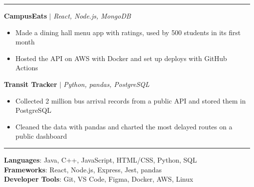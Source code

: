 \documentclass[letterpaper,11pt]{article}
\renewcommand{\section}[1]{\vspace{5pt}{\large\scshape #1}\par\vspace{-3pt}\rule{\textwidth}{0.4pt}\par\vspace{2pt}}
\newcommand{\resumeItem}[1]{\item\small{#1}}
\newcommand{\resumeSubHeadingListStart}{\begin{list}{}{\setlength{\leftmargin}{0.15in}\setlength{\itemsep}{1pt}\setlength{\topsep}{0pt}}}
\newcommand{\resumeSubHeadingListEnd}{\end{list}}
\newcommand{\resumeItemListStart}{\begin{itemize}\setlength{\itemsep}{-2pt}}
\newcommand{\resumeItemListEnd}{\end{itemize}}
\begin{document}
\section{Projects}
    \resumeSubHeadingListStart
      \item
          \textbf{CampusEats} $|$ \emph{React, Node.js, MongoDB}
          \resumeItemListStart
            \resumeItem{Made a dining hall menu app with ratings, used by 500 students in its first month}
            \resumeItem{Hosted the API on AWS with Docker and set up deploys with GitHub Actions}
          \resumeItemListEnd
      \item
          \textbf{Transit Tracker} $|$ \emph{Python, pandas, PostgreSQL}
          \resumeItemListStart
            \resumeItem{Collected 2 million bus arrival records from a public API and stored them in PostgreSQL}
            \resumeItem{Cleaned the data with pandas and charted the most delayed routes on a public dashboard}
          \resumeItemListEnd
    \resumeSubHeadingListEnd
\section{Technical Skills}
 \begin{list}{}{\setlength{\leftmargin}{0.15in}}
    \small{\item{
     \textbf{Languages}{: Java, C++, JavaScript, HTML/CSS, Python, SQL} \\
     \textbf{Frameworks}{: React, Node.js, Express, Jest, pandas} \\
     \textbf{Developer Tools}{: Git, VS Code, Figma, Docker, AWS, Linux}
    }}
 \end{list}
\end{document}
